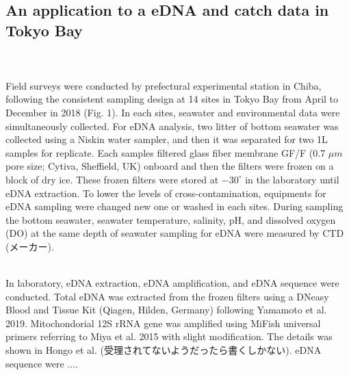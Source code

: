 \documentclass[12pt]{article}
\begin{document}
\begin{linenumbers}



\subsection{An application to a eDNA and catch data in Tokyo Bay}
\\
\\
Field surveys were conducted by prefectural experimental station in Chiba, following the consistent sampling design at 14 sites in Tokyo Bay from April to December in 2018 (Fig. 1). 
In each sites, seawater and environmental data were simultaneously collected. For eDNA analysis, two litter of bottom seawater was collected using a Niskin water sampler, and then it was separated for two 1L samples for replicate. Each samples filtered glass fiber membrane GF/F (0.7 $\mu m$ pore size; Cytiva, Sheffield, UK) onboard and then the filters were frozen on a block of dry ice. These frozen filters were stored at $-30^\circ$ in the laboratory until eDNA extraction. To lower the levels of cross-contamination, equipments for eDNA sampling were changed new one or washed in each sites. During sampling the bottom seawater, seawater temperature, salinity, pH, and dissolved oxygen (DO) at the same depth of seawater sampling for eDNA were measured by CTD (メーカー).

\\
In laboratory, eDNA extraction, eDNA amplification, and eDNA sequence were conducted. Total eDNA was extracted from the frozen filters using a DNeasy Blood and Tissue Kit (Qiagen, Hilden, Germany) following Yamamoto et al. 2019. Mitochondorial 12S rRNA gene was amplified using MiFish universal primers referring to Miya et al. 2015 with slight modification. The details was shown in Hongo et al. (受理されてないようだったら書くしかない).  eDNA sequence were ....



\end{linenumbers}
\end{document}
